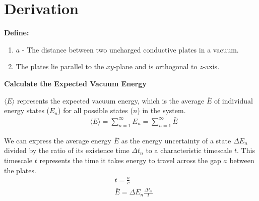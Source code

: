 \section{Derivation}
\noindent\textbf{Define:}
\begin{enumerate}
    \item $a$ - The distance between two uncharged conductive plates in a vacuum.
    \item The plates lie parallel to the \(xy\)-plane and is orthogonal to \(z\)-axis.
\end{enumerate}

\noindent\textbf{Calculate the Expected Vacuum Energy}

$\langle E \rangle$ represents the expected vacuum energy, 
which is the average $\bar E$ of individual energy states ($E_n$) for all possible states ($n$) in the system.
\begin{align}
    &\langle E \rangle = \sum_{n=1}^{\infty}E_n = \sum_{n=1}^{\infty}\bar{E}
\end{align}

We can express the average energy $\bar E$ as the energy uncertainty of 
a state $\Delta E_n$ divided by the ratio of its existence time $\Delta t_n$ 
to a characteristic timescale $t$.
This timescale $t$ represents the time it takes energy to travel across the gap $a$ between the plates.
\begin{align}
    &t = \frac{a}{c} \\
    &\bar{E} = \Delta E_n\frac{\Delta t_n}{t}
\end{align}

